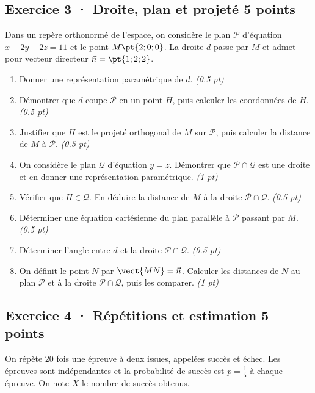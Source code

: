 \subsection*{Exercice 3 · Droite, plan et projeté \hfill 5 points}Dans un repère orthonormé de l'espace, on considère le plan $\mathcal P$ d'équation $x+2y+2z=11$ et le point $M\pt{2;0;0}$. La droite $d$ passe par $M$ et admet pour vecteur directeur $\vec n=\pt{1;2;2}$.

\begin{enumerate}

\item Donner une représentation paramétrique de $d$. \hfill\textit{(\num{0,5} pt)}

\item Démontrer que $d$ coupe $\mathcal P$ en un point $H$, puis calculer les coordonnées de $H$. \hfill\textit{(\num{0,5} pt)}

\item Justifier que $H$ est le projeté orthogonal de $M$ sur $\mathcal P$, puis calculer la distance de $M$ à $\mathcal P$. \hfill\textit{(\num{0,5} pt)}

\item On considère le plan $\mathcal Q$ d'équation $y=z$. Démontrer que $\mathcal P\cap\mathcal Q$ est une droite et en donner une représentation paramétrique. \hfill\textit{(1 pt)}

\item Vérifier que $H\in\mathcal Q$. En déduire la distance de $M$ à la droite $\mathcal P\cap\mathcal Q$. \hfill\textit{(\num{0,5} pt)}

\item Déterminer une équation cartésienne du plan parallèle à $\mathcal P$ passant par $M$. \hfill\textit{(\num{0,5} pt)}

\item Déterminer l'angle entre $d$ et la droite $\mathcal P\cap\mathcal Q$. \hfill\textit{(\num{0,5} pt)}

\item On définit le point $N$ par $\vect{MN}=\vec n$. Calculer les distances de $N$ au plan $\mathcal P$ et à la droite $\mathcal P\cap\mathcal Q$, puis les comparer. \hfill\textit{(1 pt)}

\end{enumerate}

\subsection*{Exercice 4 · Répétitions et estimation \hfill 5 points}On répète $20$ fois une épreuve à deux issues, appelées succès et échec. Les épreuves sont indépendantes et la probabilité de succès est $p=\frac{1}{5}$ à chaque épreuve. On note $X$ le nombre de succès obtenus.

